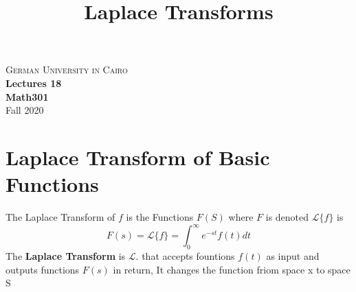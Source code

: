 \documentclass[11pt]{article}
\theoremstyle{definition}
\begin{document}
\setcounter{section}{0}
\title{Laplace Transforms}
\newcommand{\bb}{\mathcal{L}}
\newtheorem*{remark}{Remark}

\thispagestyle{empty}
\begin{center}
\textsc{\LARGE German University in Cairo}\\[1.0cm]
{\LARGE \bf Lectures 18}\\ [0.5cm]
{\large \bf Math301}\\ [0.5cm]
Fall 2020
\end{center}
\tableofcontents
\newpage
\section{Laplace Transform of Basic Functions}
The Laplace Transform of $f$ is the Functions $F(S)$ where $F$ is denoted $\bb\{f\}$
is 
\begin{equation}
    F(s) = \bb \{ f\} = \int ^{\infty}_{0} e^{-st}f(t)dt
\end{equation}
The \textbf{Laplace Transform} is $\bb{.}$ that accepts fountions $f(t)$ as input and outputs
functions $F(s)$ in return,   It changes the function friom space x to space S
\end{document}
